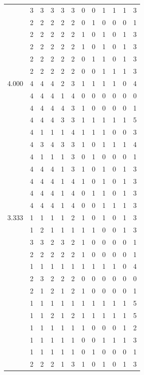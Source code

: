\documentclass[]{msu-thesis}
\theoremstyle{definition}
\theoremstyle{definition}
\theoremstyle{definition}
\theoremstyle{remark}
\begin{document}
\begin{table}
{\begin{tabular}[t]{rrrrrrrrrrrr}
 & 3 & 3 & 3 & 3 & 3 & 0 & 0 & 1 & 1 & 1 & 3\\
 & 2 & 2 & 2 & 2 & 2 & 0 & 1 & 0 & 0 & 0 & 1\\
 & 2 & 2 & 2 & 2 & 2 & 1 & 0 & 1 & 0 & 1 & 3\\
 & 2 & 2 & 2 & 2 & 2 & 1 & 0 & 1 & 0 & 1 & 3\\
 & 2 & 2 & 2 & 2 & 2 & 0 & 1 & 1 & 0 & 1 & 3\\
 & 2 & 2 & 2 & 2 & 2 & 0 & 0 & 1 & 1 & 1 & 3\\
4.000 & 4 & 4 & 4 & 2 & 3 & 1 & 1 & 1 & 1 & 0 & 4\\
 & 4 & 4 & 4 & 1 & 4 & 0 & 0 & 0 & 0 & 0 & 0\\
 & 4 & 4 & 4 & 4 & 3 & 1 & 0 & 0 & 0 & 0 & 1\\
 & 4 & 4 & 4 & 3 & 3 & 1 & 1 & 1 & 1 & 1 & 5\\
 & 4 & 1 & 1 & 1 & 4 & 1 & 1 & 1 & 0 & 0 & 3\\
 & 4 & 3 & 4 & 3 & 3 & 1 & 0 & 1 & 1 & 1 & 4\\
 & 4 & 1 & 1 & 1 & 3 & 0 & 1 & 0 & 0 & 0 & 1\\
 & 4 & 4 & 4 & 1 & 3 & 1 & 0 & 1 & 0 & 1 & 3\\
 & 4 & 4 & 4 & 1 & 4 & 1 & 0 & 1 & 0 & 1 & 3\\
 & 4 & 4 & 4 & 1 & 4 & 0 & 1 & 1 & 0 & 1 & 3\\
 & 4 & 4 & 4 & 1 & 4 & 0 & 0 & 1 & 1 & 1 & 3\\
3.333 & 1 & 1 & 1 & 1 & 2 & 1 & 0 & 1 & 0 & 1 & 3\\
 & 1 & 2 & 1 & 1 & 1 & 1 & 1 & 0 & 0 & 1 & 3\\
 & 3 & 3 & 2 & 3 & 2 & 1 & 0 & 0 & 0 & 0 & 1\\
 & 2 & 2 & 2 & 2 & 2 & 1 & 0 & 0 & 0 & 0 & 1\\
 & 1 & 1 & 1 & 1 & 1 & 1 & 1 & 1 & 1 & 0 & 4\\
 & 2 & 3 & 2 & 2 & 2 & 0 & 0 & 0 & 0 & 0 & 0\\
 & 2 & 1 & 2 & 1 & 2 & 1 & 0 & 0 & 0 & 0 & 1\\
 & 1 & 1 & 1 & 1 & 1 & 1 & 1 & 1 & 1 & 1 & 5\\
 & 1 & 1 & 2 & 1 & 2 & 1 & 1 & 1 & 1 & 1 & 5\\
 & 1 & 1 & 1 & 1 & 1 & 1 & 0 & 0 & 0 & 1 & 2\\
 & 1 & 1 & 1 & 1 & 1 & 0 & 0 & 1 & 1 & 1 & 3\\
 & 1 & 1 & 1 & 1 & 1 & 0 & 1 & 0 & 0 & 0 & 1\\
 & 2 & 2 & 2 & 1 & 3 & 1 & 0 & 1 & 0 & 1 & 3\\

\end{tabular}}
\end{table}
\end{document}
